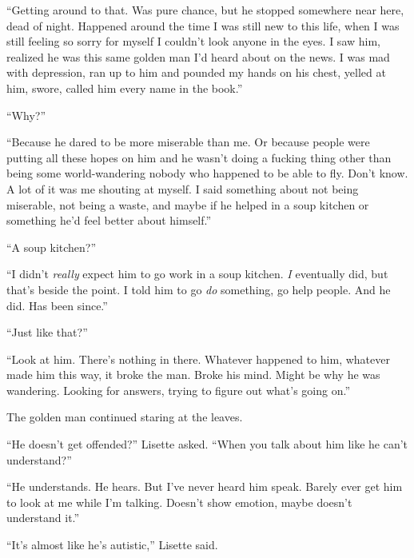 ``Getting around to that.  Was pure chance, but he stopped somewhere near here, dead of night.  Happened around the time I was still new to this life, when I was still feeling so sorry for myself I couldn't look anyone in the eyes.  I saw him, realized he was this same golden man I'd heard about on the news.  I was mad with depression, ran up to him and pounded my hands on his chest, yelled at him, swore, called him every name in the book.''



``Why?''



``Because he dared to be more miserable than me.  Or because people were putting all these hopes on him and he wasn't doing a fucking thing other than being some world-wandering nobody who happened to be able to fly.  Don't know.  A lot of it was me shouting at myself.  I said something about not being miserable, not being a waste, and maybe if he helped in a soup kitchen or something he'd feel better about himself.''



``A soup kitchen?''



``I didn't \emph{really} expect him to go work in a soup kitchen.  \emph{I} eventually did, but that's beside the point.  I told him to go \emph{do }something, go help people.  And he did.  Has been since.''



``Just like that?''



``Look at him.  There's nothing in there.  Whatever happened to him, whatever made him this way, it broke the man.  Broke his mind.  Might be why he was wandering.  Looking for answers, trying to figure out what's going on.''



The golden man continued staring at the leaves.



``He doesn't get offended?'' Lisette asked.  ``When you talk about him like he can't understand?''



``He understands.  He hears.  But I've never heard him speak.  Barely ever get him to look at me while I'm talking.  Doesn't show emotion, maybe doesn't understand it.''



``It's almost like he's autistic,'' Lisette said.



